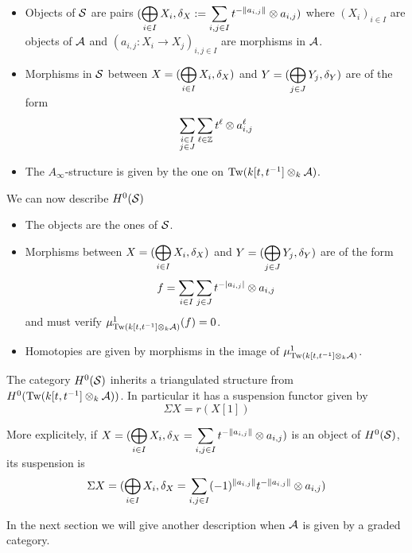 \documentclass[12pt]{article}
\begin{document}
	\begin{itemize}
		\item Objects of ${\cal{S}}$ are pairs $(\displaystyle\bigoplus_{i \in I} X_i,\delta_X:= \displaystyle\sum_{i,j \in I} t^{- \|a_{i,j}\|} \otimes a_{i,j})$ where $(X_i)_{i \in I}$ are objects of ${\cal{A}}$ and $(a_{i,j}: X_i \to X_j)_{i,j \in I}$ are morphisms in ${\cal{A}}$.
		\item Morphisms in ${\cal{S}}$ between $X = (\displaystyle\bigoplus_{i \in I} X_i, \delta_X)$ and $Y = (\displaystyle\bigoplus_{j \in J} Y_j, \delta_Y)$ are of the form 
		\[\displaystyle\sum_{\substack{i \in I \\ j \in J}} \sum_{\ell \in \mathbb{Z}}  t^{\ell} \otimes a^\ell_{i,j}\]
		\item The $A_\infty$-structure is given by the one on $\textup{Tw}(k[t,t^{-1}] \otimes_k {\cal{A}})$.
	\end{itemize} 
	
	\noindent We can now describe $H^0({\cal{S}})$
	
	\begin{itemize}
		\item The objects are the ones of ${\cal{S}}$.
		\item Morphisms between $X = (\displaystyle\bigoplus_{i \in I} X_i, \delta_X)$ and $Y = (\displaystyle\bigoplus_{j \in J} Y_j, \delta_Y)$ are of the form 
		\[f = \displaystyle\sum_{i \in I} \sum_{j \in J} t^{-|a_{i,j}|} \otimes a_{i,j}\]
		and must verify $\mu^1_{\textup{Tw}(k[t,t^{-1}] \otimes_k {\cal{A}})}(f) = 0$.
		\item Homotopies are given by morphisms in the image of $\mu^1_{\textup{Tw}(k[t,t^{-1}] \otimes_k {\cal{A}})}$.
	\end{itemize}
	
	\begin{remark}
		
	\label{suspH0}
	
	The category $H^0({\cal{S}})$ inherits a triangulated structure from $H^0(\textup{Tw}(k[t,t^{-1}] \otimes_k {\cal{A}}))$. In particular it has a suspension functor given by 
	\[\Sigma X = r(X[1])\]
	
	\noindent More explicitely, if $X = (\displaystyle\bigoplus_{i \in I} X_i,\delta_X= \displaystyle\sum_{i,j \in I} t^{- \|a_{i,j}\|} \otimes a_{i,j})$ is an object of $H^0({\cal{S}})$, its suspension is
	\[\Sigma X = (\displaystyle\bigoplus_{i \in I} X_i,\delta_X= \displaystyle\sum_{i,j \in I} (-1)^{\|a_{i,j}\|}t^{- \|a_{i,j}\|} \otimes a_{i,j})\]
	
	\end{remark}
	
	\noindent In the next section we will give another description when ${\cal{A}}$ is given by a graded category.
	
\end{document}
